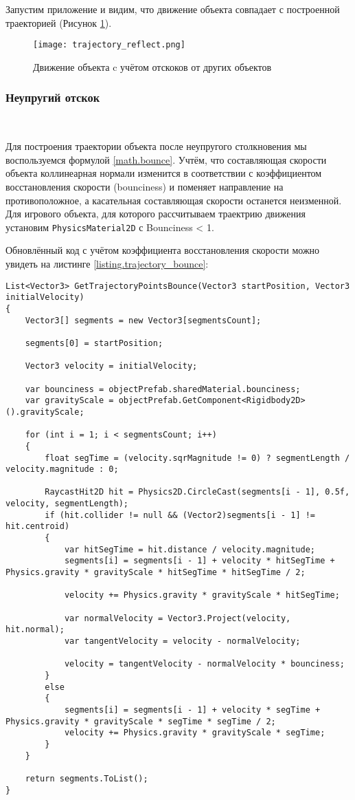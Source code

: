 Запустим приложение и видим, что движение объекта совпадает с построенной траекторией (Рисунок \ref{picture.trajectory_reflect}).

\begin{figure}[h]
	\noindent\centering
	\texttt{[image: trajectory\_reflect.png]}  
	\caption{Движение объекта c учётом отскоков от других объектов}
	\label{picture.trajectory_reflect}
\end{figure}

\subsubsection{Неупругий отскок}~

Для построения траектории объекта после неупругого столкновения мы воспользуемся формулой \ref{math.bounce}. Учтём, что составляющая скорости объекта коллинеарная нормали изменится в соответствии с коэффициентом восстановления скорости (bounciness) и поменяет направление на противоположное, а касательная составляющая скорости останется неизменной. Для игрового объекта, для которого рассчитываем траектрию движения установим \lstinline|PhysicsMaterial2D| с Bounciness < 1.

Обновлённый код с учётом коэффициента восстановления скорости можно увидеть на листинге \ref{listing.trajectory_bounce}:

\begin{lstlisting}[style=fsharpstyle, caption={Построение траектории движущегося объекта c учётом коэффициента восстановления}, label=listing.trajectory_bounce]
List<Vector3> GetTrajectoryPointsBounce(Vector3 startPosition, Vector3 initialVelocity)
{
	Vector3[] segments = new Vector3[segmentsCount];
	
	segments[0] = startPosition;
	
	Vector3 velocity = initialVelocity;
	
	var bounciness = objectPrefab.sharedMaterial.bounciness;
	var gravityScale = objectPrefab.GetComponent<Rigidbody2D>().gravityScale;
	
	for (int i = 1; i < segmentsCount; i++)
	{
		float segTime = (velocity.sqrMagnitude != 0) ? segmentLength / velocity.magnitude : 0;
		
		RaycastHit2D hit = Physics2D.CircleCast(segments[i - 1], 0.5f, velocity, segmentLength);
		if (hit.collider != null && (Vector2)segments[i - 1] != hit.centroid)
		{
			var hitSegTime = hit.distance / velocity.magnitude;
			segments[i] = segments[i - 1] + velocity * hitSegTime + Physics.gravity * gravityScale * hitSegTime * hitSegTime / 2;
			
			velocity += Physics.gravity * gravityScale * hitSegTime;
			
			var normalVelocity = Vector3.Project(velocity, hit.normal);
			var tangentVelocity = velocity - normalVelocity;
			
			velocity = tangentVelocity - normalVelocity * bounciness;
		}
		else
		{
			segments[i] = segments[i - 1] + velocity * segTime + Physics.gravity * gravityScale * segTime * segTime / 2;
			velocity += Physics.gravity * gravityScale * segTime;
		}
	}
	
	return segments.ToList();
}
\end{lstlisting}

